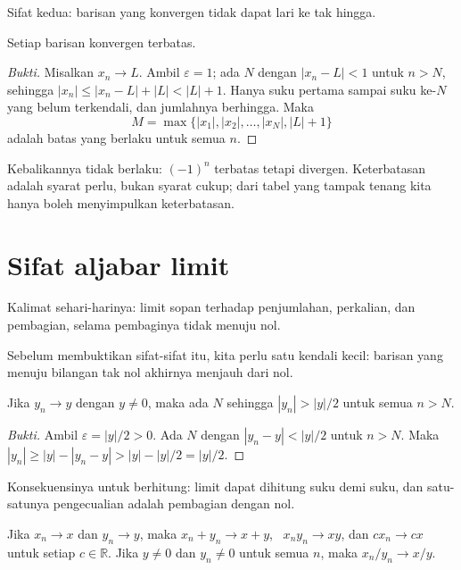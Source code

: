 Sifat kedua: barisan yang konvergen tidak dapat lari ke tak hingga.

\begin{teorema}
Setiap barisan konvergen terbatas.
\end{teorema}

\begin{proof}[Bukti]
Misalkan $x_n \to L$. Ambil $\varepsilon=1$; ada $N$ dengan $|x_n-L|<1$ untuk
$n>N$, sehingga $|x_n| \le |x_n-L|+|L| < |L|+1$. Hanya suku pertama sampai suku
ke-$N$ yang belum terkendali, dan jumlahnya berhingga. Maka
\[
M=\max\{|x_1|,|x_2|,\dots,|x_N|,|L|+1\}
\]
adalah batas yang berlaku untuk semua $n$.
\end{proof}

Kebalikannya tidak berlaku: $(-1)^n$ terbatas tetapi divergen. Keterbatasan adalah
syarat perlu, bukan syarat cukup; dari tabel yang tampak tenang kita hanya boleh
menyimpulkan keterbatasan.

\section{Sifat aljabar limit}

Kalimat sehari-harinya: limit sopan terhadap penjumlahan, perkalian, dan pembagian,
selama pembaginya tidak menuju nol.

Sebelum membuktikan sifat-sifat itu, kita perlu satu kendali kecil: barisan yang
menuju bilangan tak nol akhirnya menjauh dari nol.

\begin{lemma}
Jika $y_n \to y$ dengan $y \neq 0$, maka ada $N$ sehingga $|y_n|>|y|/2$ untuk
semua $n>N$.
\end{lemma}

\begin{proof}[Bukti]
Ambil $\varepsilon=|y|/2>0$. Ada $N$ dengan $|y_n-y|<|y|/2$ untuk $n>N$. Maka
$|y_n| \ge |y|-|y_n-y| > |y|-|y|/2 = |y|/2$.
\end{proof}

Konsekuensinya untuk berhitung: limit dapat dihitung suku demi suku, dan satu-satunya
pengecualian adalah pembagian dengan nol.

\begin{teorema}
Jika $x_n \to x$ dan $y_n \to y$, maka
$x_n+y_n \to x+y$, \ $x_n y_n \to xy$, dan $c x_n \to cx$ untuk setiap
$c \in \mathbb{R}$. Jika $y \neq 0$ dan $y_n \neq 0$ untuk semua $n$, maka
$x_n/y_n \to x/y$.
\end{teorema}

